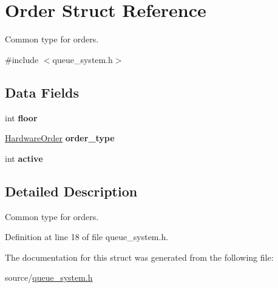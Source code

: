 \hypertarget{structOrder}{}\section{Order Struct Reference}
\label{structOrder}


Common type for orders.  




{\ttfamily \#include $<$queue\+\_\+system.\+h$>$}

\subsection*{Data Fields}
\begin{DoxyCompactItemize}
\item 
\mbox{\label{structOrder_a5243dc659272f25ee0b39a569b9bbd43}} 
int {\bfseries floor}
\item 
\mbox{\label{structOrder_aeddebdba3b07c66358921945e8710825}} 
\hyperlink{hardware_8h_a796a8de8ce0ae769d7dbd3327a7bdbe7}{Hardware\+Order} {\bfseries order\+\_\+type}
\item 
\mbox{\label{structOrder_ae636e03956cfac91b4845f22787770b3}} 
int {\bfseries active}
\end{DoxyCompactItemize}


\subsection{Detailed Description}
Common type for orders. 

Definition at line 18 of file queue\+\_\+system.\+h.



The documentation for this struct was generated from the following file\+:\begin{DoxyCompactItemize}
\item 
source/\hyperlink{queue__system_8h}{queue\+\_\+system.\+h}\end{DoxyCompactItemize}
